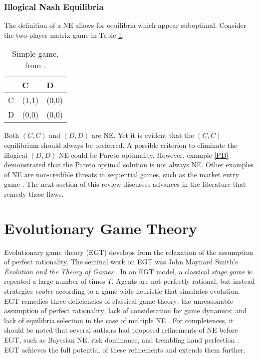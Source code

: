 \subsubsection{Illogical Nash Equilibria}
The definition of a NE allows for equilibria which appear suboptimal. Consider the two-player matrix game in Table \ref{SG}. 

\begin{table}[hbt!] %
\begin{center}
\centering
\begin{tabular}{|l|l|l|}
\hline
  & C     & D     \\ \hline
C & (1,1) & (0,0) \\ \hline
D & (0,0) & (0,0) \\ \hline
\end{tabular}
\caption{Simple game, from \cite{RN79}.}
\label{SG}
\end{center}
\end{table}
Both $(C,C)$ and $(D,D)$ are NE. Yet it is evident that the $(C,C)$ equilibrium should always be preferred. A possible criterion to eliminate the illogical $(D,D)$ NE could be Pareto optimality. However, example \ref{PD} demonstrated that the Pareto optimal solution is not always NE. Other examples of  NE are non-credible threats in sequential games, such as the market entry game \cite{RN79}. The next section of this review discusses advances in the literature that remedy these flaws. 


\section{Evolutionary Game Theory} \label{EGT}

Evolutionary game theory (EGT) develops from the relaxation of the assumption of perfect rationality. The seminal work on EGT was John Maynard Smith's \emph{Evolution and the Theory of Games} \cite{RN99}. In an EGT model, a classical \emph{stage game} is repeated a large number of times $T$. Agents are not perfectly rational, but instead strategies \emph{evolve} according to a game-wide heuristic that simulates evolution. EGT remedies three deficiencies of classical game theory: the unreasonable assumption of perfect rationality; lack of consideration for game dynamics; and lack of equilibria selection in the case of multiple NE \cite{RN99}. For completeness, it should be noted that several authors had proposed refinements of NE before EGT, such as Bayesian NE, risk dominance, and trembling hand perfection \cite{RN39}. EGT achieves the full potential of these refinements and extends them further.  

